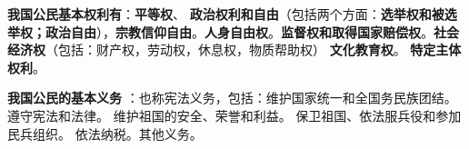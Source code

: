 \textbf{我国公民基本权利有}：\textbf{平等权}、
\textbf{政治权利和自由}（包括两个方面：\textbf{选举权和被选举权；政治自由}），\textbf{宗教信仰自由}。\textbf{人身自由权}。\textbf{监督权和取得国家赔偿权}。\textbf{社会经济权}（包括：财产权，劳动权，休息权，物质帮助权）
\textbf{文化教育权}。 \textbf{特定主体权利}。

\textbf{我国公民的基本义务}{
：也称宪法义务，包括：维护国家统一和全国务民族团结。 遵守宪法和法律。
维护祖国的安全、荣誉和利益。 保卫祖国、依法服兵役和参加民兵组织。
依法纳税。其他义务。}
